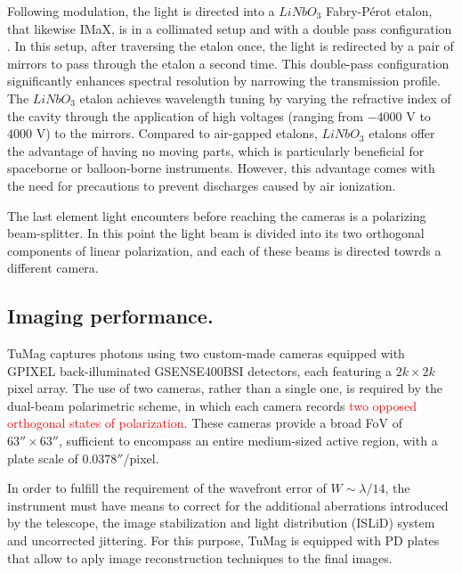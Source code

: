 Following modulation, the light is directed into a $LiNbO_3$ Fabry-Pérot etalon, that likewise IMaX, is in a collimated setup and with a double pass configuration \citep{etalon-doublepass}. In this setup, after traversing the etalon once, the light is redirected by a pair of mirrors to pass through the etalon a second time. This double-pass configuration significantly enhances spectral resolution by narrowing the transmission profile. The $LiNbO_3$ etalon achieves wavelength tuning by varying the refractive index of the cavity through the application of high voltages (ranging from $-4000$ V to $4000$ V) to the mirrors. Compared to air-gapped etalons, $LiNbO_3$ etalons offer the advantage of having no moving parts, which is particularly beneficial for spaceborne or balloon-borne instruments. However, this advantage comes with the need for precautions to prevent discharges caused by air ionization.

The last element light encounters before reaching the cameras is a polarizing beam-splitter. In this point the light beam is divided into its two orthogonal components of linear polarization, and each of these beams is directed towrds a different camera.    




\subsection{Imaging performance.}

TuMag captures photons using two custom-made cameras \citep{tumag-cams} equipped with GPIXEL back-illuminated GSENSE400BSI detectors, each featuring a $2k \times 2k$ pixel array. The use of two cameras, rather than a single one, is required by the dual-beam polarimetric scheme, in which each camera records \textcolor{red}{two opposed orthogonal states of polarization}. These cameras provide a broad FoV of $63'' \times 63''$, sufficient to encompass an entire medium-sized active region, with a plate scale of $0.0378''$/pixel.

In order to fulfill the requirement of the wavefront error of $W \sim \lambda / 14$, the instrument must have means to correct for the additional aberrations introduced by the telescope, the image stabilization and light distribution (ISLiD) system and uncorrected jittering. For this purpose, TuMag is equipped with PD plates that allow to aply image reconstruction  techniques to the final images. 



